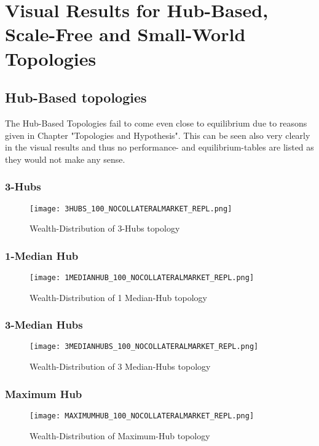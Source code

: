 \documentclass[Bachelorarbeit.tex]{subfiles}
\begin{document}
\graphicspath{{./figures/appendixResults/}}	%

\chapter{Visual Results for Hub-Based, Scale-Free and Small-World Topologies}
  
\section{Hub-Based topologies} 
The Hub-Based Topologies fail to come even close to equilibrium due to reasons given in Chapter "Topologies and Hypothesis". This can be seen also very clearly in the visual results and thus no performance- and equilibrium-tables are listed as they would not make any sense.

\subsection{3-Hubs}
\begin{figure}[H]
	\centering
  \texttt{[image: 3HUBS\_100\_NOCOLLATERALMARKET\_REPL.png]}
	\caption{Wealth-Distribution of 3-Hubs topology}
	\label{fig1}
\end{figure}

\subsection{1-Median Hub}
\begin{figure}[H]
	\centering
  \texttt{[image: 1MEDIANHUB\_100\_NOCOLLATERALMARKET\_REPL.png]}
	\caption{Wealth-Distribution of 1 Median-Hub topology}
	\label{fig1}
\end{figure}

\subsection{3-Median Hubs}
\begin{figure}[H]
	\centering
  \texttt{[image: 3MEDIANHUBS\_100\_NOCOLLATERALMARKET\_REPL.png]}
	\caption{Wealth-Distribution of 3 Median-Hubs topology}
	\label{fig1}
\end{figure}

\subsection{Maximum Hub}
\begin{figure}[H]
	\centering
  \texttt{[image: MAXIMUMHUB\_100\_NOCOLLATERALMARKET\_REPL.png]}
	\caption{Wealth-Distribution of Maximum-Hub topology}
	\label{fig1}
\end{figure}
\end{document}
